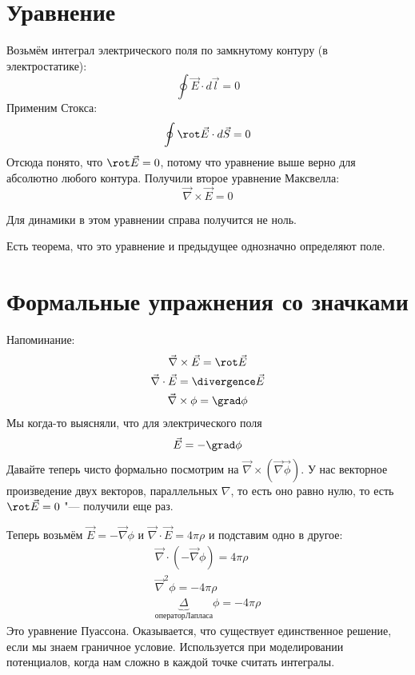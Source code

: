 	\section{Уравнение}
		Возьмём интеграл электрического поля по замкнутому контуру (в электростатике):
		\[ \oint \vec E \cdot d \vec l = 0 \]
		Применим Стокса:
		\[ \oint \rot \vec E \cdot d \vec S = 0 \]
		Отсюда понято, что $\rot \vec E = 0$, потому что уравнение выше верно для абсолютно любого контура.
		Получили второе уравнение Максвелла:
		\[ \vec \nabla \times \vec E = 0 \]

		\begin{Rem}
			Для динамики в этом уравнении справа получится не ноль.
		\end{Rem}
		\begin{Rem}
			Есть теорема, что это уравнение и предыдущее однозначно определяют поле.
		\end{Rem}

\section{Формальные упражнения со значками}
	Напоминание:
	\begin{gather*}
	\vec \nabla \times \vec E = \rot \vec E \\
	\vec \nabla \cdot \vec E = \divergence \vec E \\
	\vec \nabla \times \phi = \grad \phi
	\end{gather*}
	Мы когда-то выясняли, что для электрического поля
	\[ \vec E = -\grad \phi \]
	Давайте теперь чисто формально посмотрим на $\vec \nabla \times (\vec \nabla \vec \phi)$.
	У нас векторное произведение двух векторов, параллельных $\nabla$, то есть оно равно нулю,
	то есть $\rot \vec E = 0$ "--- получили еще раз.

	Теперь возьмём $\vec E = - \vec \nabla \phi$ и $\vec \nabla \cdot \vec E = 4 \pi \rho$ и подставим одно в другое:
	\begin{gather*}
	\vec \nabla \cdot (-\vec \nabla \phi) = 4 \pi \rho \\
	\vec \nabla ^2 \phi = -4\pi \rho \\
	\underbrace{\Delta}_{оператор Лапласа} \phi = -4 \pi \rho
	\end{gather*}
	Это уравнение Пуассона.
	Оказывается, что существует единственное решение, если мы знаем граничное условие.
	Используется при моделировании потенциалов, когда нам сложно в каждой точке считать интегралы.
